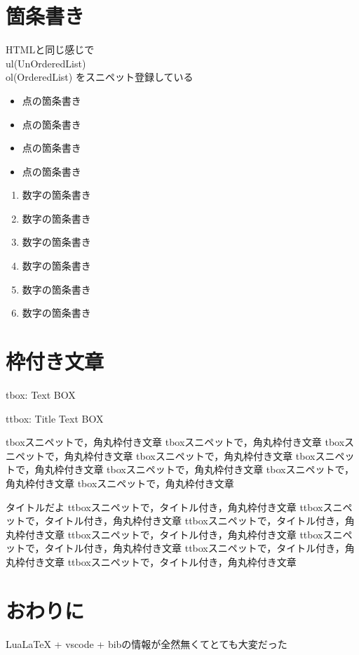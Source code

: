 \documentclass[a4paper, 12pt]{ltjsarticle}
\begin{document}
\section{箇条書き}

HTMLと同じ感じで
\\ ul(UnOrderedList)
\\ ol(OrderedList)
をスニペット登録している

\begin{itemize}
  \item 点の箇条書き
  \item 点の箇条書き
  \item 点の箇条書き
  \item 点の箇条書き
\end{itemize}

\begin{enumerate}
  \item 数字の箇条書き
  \item 数字の箇条書き
  \item 数字の箇条書き
  \item 数字の箇条書き
  \item 数字の箇条書き
  \item 数字の箇条書き
\end{enumerate}


\section{枠付き文章}

tbox: Text BOX

ttbox: Title Text BOX

\begin{screen}
  tboxスニペットで，角丸枠付き文章
  tboxスニペットで，角丸枠付き文章
  tboxスニペットで，角丸枠付き文章
  tboxスニペットで，角丸枠付き文章
  tboxスニペットで，角丸枠付き文章
  tboxスニペットで，角丸枠付き文章
  tboxスニペットで，角丸枠付き文章
  tboxスニペットで，角丸枠付き文章
\end{screen}

\begin{itembox}{タイトルだよ}
  ttboxスニペットで，タイトル付き，角丸枠付き文章
  ttboxスニペットで，タイトル付き，角丸枠付き文章
  ttboxスニペットで，タイトル付き，角丸枠付き文章
  ttboxスニペットで，タイトル付き，角丸枠付き文章
  ttboxスニペットで，タイトル付き，角丸枠付き文章
  ttboxスニペットで，タイトル付き，角丸枠付き文章
  ttboxスニペットで，タイトル付き，角丸枠付き文章
\end{itembox}


\section{おわりに}
LuaLaTeX + vscode + bibの情報が全然無くてとても大変だった



\end{document}

